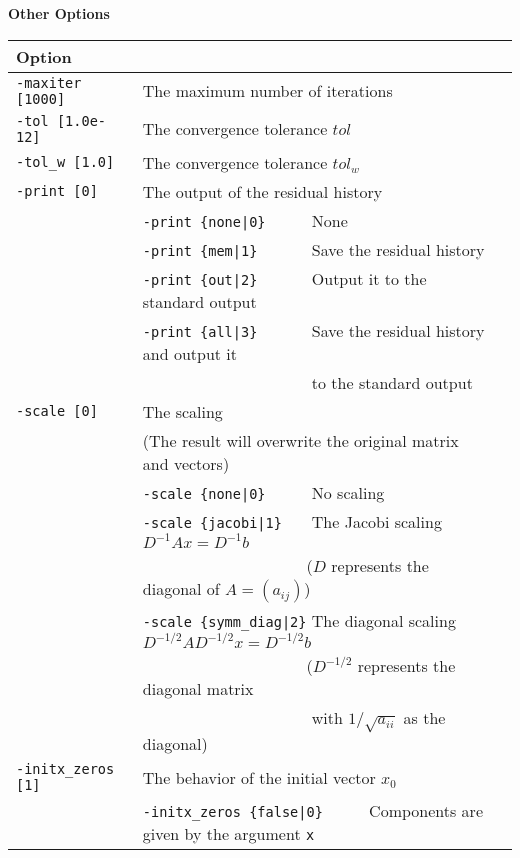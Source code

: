 \documentclass[a4paper]{article}
\begin{document}
\begin{minipage}[t]{\textwidth}
\begin{center}
{\bf Other Options}\\
\begin{tabular}{l|ll}\hline\hline
Option &                          \\ \hline
\verb=-maxiter [1000]= & The maximum number of iterations         \\ 
\verb=-tol [1.0e-12]=  & The convergence tolerance $tol$             \\
\verb=-tol_w [1.0]=    & The convergence tolerance $tol_w$  \\
\verb=-print [0]=      & The output of the residual history                \\
                       & \verb=-print {none|0}     =  None \\
                       & \verb=-print {mem|1}      =  Save the residual history\\
                       & \verb=-print {out|2}      =  Output it to the standard output\\
                       & \verb=-print {all|3}      =  Save the residual history and output it \\
                       & \verb=                    =  to the standard output\\
\verb=-scale [0]=      & The scaling \\
                       & (The result will overwrite the original matrix and vectors) \\
                       & \verb=-scale {none|0}     =  No scaling \\ 
                       & \verb=-scale {jacobi|1}   =  The Jacobi scaling $D^{-1}Ax=D^{-1}b$ \\
                       & \verb=                    =  ($D$ represents the diagonal of $A=(a_{ij})$)\\
                       & \verb=-scale {symm_diag|2}=  The diagonal scaling $D^{-1/2}AD^{-1/2}x=D^{-1/2}b$ \\
                       & \verb=                    =  ($D^{-1/2}$ represents the diagonal matrix \\
                       & \verb=                    =  with $1/\sqrt{a_{ii}}$ as the diagonal) \\ 
\verb=-initx_zeros [1]= & The behavior of the initial vector $x_{0}$  \\
                       & \verb=-initx_zeros {false|0}     =  Components are given by the argument \verb=x= \\

\end{tabular}
\end{center}
\end{minipage}
\end{document}
